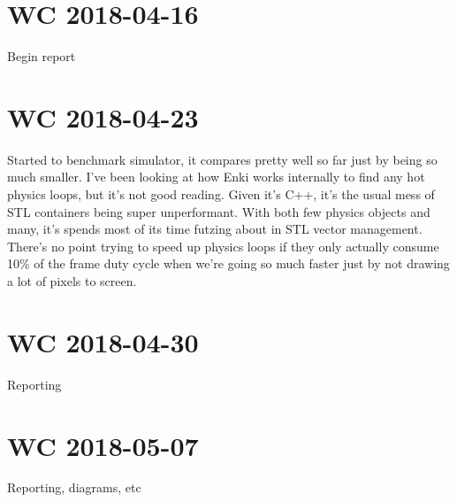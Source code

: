 \documentclass[a4paper]{article}
\begin{document}
\section{WC 2018-04-16}
    Begin report
\section{WC 2018-04-23}
    Started to benchmark simulator, it compares pretty well so far just by being so much smaller. I've been looking at
    how Enki works internally to find any hot physics loops, but it's not good reading. Given it's C++, it's the usual
    mess of STL containers being super unperformant. With both few physics objects and many, it's spends most of its
    time futzing about in STL vector management. There's no point trying to speed up physics loops if they only actually
    consume 10\% of the frame duty cycle when we're going so much faster just by not drawing a lot of pixels to screen.
\section{WC 2018-04-30}
    Reporting
\section{WC 2018-05-07}
    Reporting, diagrams, etc
\end{document}
